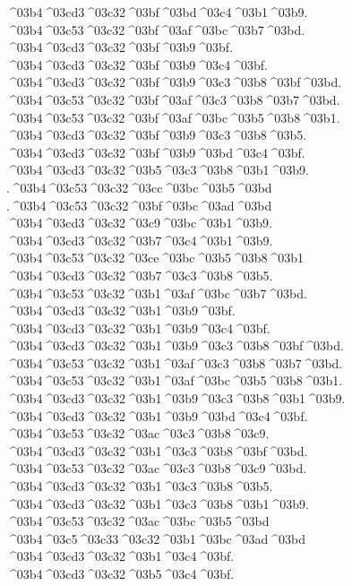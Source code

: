 {	^^^^03b4^^^^03cd3^^^^03c32^^^^03bf^^^^03bd^^^^03c4^^^^03b1^^^^03b9.
	^^^^03b4^^^^03c53^^^^03c32^^^^03bf^^^^03af^^^^03bc^^^^03b7^^^^03bd.
	^^^^03b4^^^^03cd3^^^^03c32^^^^03bf^^^^03b9^^^^03bf.
	^^^^03b4^^^^03cd3^^^^03c32^^^^03bf^^^^03b9^^^^03c4^^^^03bf.
	^^^^03b4^^^^03cd3^^^^03c32^^^^03bf^^^^03b9^^^^03c3^^^^03b8^^^^03bf^^^^03bd.
	^^^^03b4^^^^03c53^^^^03c32^^^^03bf^^^^03af^^^^03c3^^^^03b8^^^^03b7^^^^03bd.
	^^^^03b4^^^^03c53^^^^03c32^^^^03bf^^^^03af^^^^03bc^^^^03b5^^^^03b8^^^^03b1.
	^^^^03b4^^^^03cd3^^^^03c32^^^^03bf^^^^03b9^^^^03c3^^^^03b8^^^^03b5.
	^^^^03b4^^^^03cd3^^^^03c32^^^^03bf^^^^03b9^^^^03bd^^^^03c4^^^^03bf.
	^^^^03b4^^^^03cd3^^^^03c32^^^^03b5^^^^03c3^^^^03b8^^^^03b1^^^^03b9.
	.^^^^03b4^^^^03c53^^^^03c32^^^^03cc^^^^03bc^^^^03b5^^^^03bd		%
	.^^^^03b4^^^^03c53^^^^03c32^^^^03bf^^^^03bc^^^^03ad^^^^03bd
	^^^^03b4^^^^03cd3^^^^03c32^^^^03c9^^^^03bc^^^^03b1^^^^03b9.
	^^^^03b4^^^^03cd3^^^^03c32^^^^03b7^^^^03c4^^^^03b1^^^^03b9.
	^^^^03b4^^^^03c53^^^^03c32^^^^03ce^^^^03bc^^^^03b5^^^^03b8^^^^03b1
	^^^^03b4^^^^03cd3^^^^03c32^^^^03b7^^^^03c3^^^^03b8^^^^03b5.
	^^^^03b4^^^^03c53^^^^03c32^^^^03b1^^^^03af^^^^03bc^^^^03b7^^^^03bd.
	^^^^03b4^^^^03cd3^^^^03c32^^^^03b1^^^^03b9^^^^03bf.
	^^^^03b4^^^^03cd3^^^^03c32^^^^03b1^^^^03b9^^^^03c4^^^^03bf.
	^^^^03b4^^^^03cd3^^^^03c32^^^^03b1^^^^03b9^^^^03c3^^^^03b8^^^^03bf^^^^03bd.
	^^^^03b4^^^^03c53^^^^03c32^^^^03b1^^^^03af^^^^03c3^^^^03b8^^^^03b7^^^^03bd.
	^^^^03b4^^^^03c53^^^^03c32^^^^03b1^^^^03af^^^^03bc^^^^03b5^^^^03b8^^^^03b1.
	^^^^03b4^^^^03cd3^^^^03c32^^^^03b1^^^^03b9^^^^03c3^^^^03b8^^^^03b1^^^^03b9.
	^^^^03b4^^^^03cd3^^^^03c32^^^^03b1^^^^03b9^^^^03bd^^^^03c4^^^^03bf.
	^^^^03b4^^^^03c53^^^^03c32^^^^03ac^^^^03c3^^^^03b8^^^^03c9.
	^^^^03b4^^^^03cd3^^^^03c32^^^^03b1^^^^03c3^^^^03b8^^^^03bf^^^^03bd.
	^^^^03b4^^^^03c53^^^^03c32^^^^03ac^^^^03c3^^^^03b8^^^^03c9^^^^03bd.
	^^^^03b4^^^^03cd3^^^^03c32^^^^03b1^^^^03c3^^^^03b8^^^^03b5.
	^^^^03b4^^^^03cd3^^^^03c32^^^^03b1^^^^03c3^^^^03b8^^^^03b1^^^^03b9.
	^^^^03b4^^^^03c53^^^^03c32^^^^03ac^^^^03bc^^^^03b5^^^^03bd  		%
	^^^^03b4^^^^03c5^^^^03c33^^^^03c32^^^^03b1^^^^03bc^^^^03ad^^^^03bd
	^^^^03b4^^^^03cd3^^^^03c32^^^^03b1^^^^03c4^^^^03bf.   		%
	^^^^03b4^^^^03cd3^^^^03c32^^^^03b5^^^^03c4^^^^03bf.  		%
}
